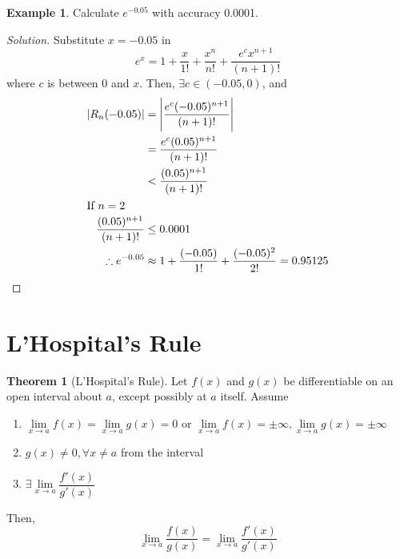 \documentclass[fleqn]{article}
\theoremstyle{definition}
\newtheorem{example}{Example}
\theoremstyle{theorem}
\newtheorem{theorem}{Theorem}
\theoremstyle{remark}
\newenvironment{solution}
{\begin{proof}[Solution]\let\qed\relax}
	{\end{proof}}
\begin{document}
\begin{example}
	Calculate $e^{-0.05}$ with accuracy 0.0001.
\end{example}

\begin{solution}
	Substitute $x = -0.05$ in 
	\begin{equation*}
		e^x = 1 + \dfrac{x}{1!} + \dfrac{x^n}{n!} + \dfrac{e^c x^{n+1}}{(n+1)!}
	\end{equation*}
	where $c$ is between 0 and $x$.
	Then, $\exists c \in (-0.05, 0)$, and 
	\begin{align*}
		|R_n (-0.05)| &= \left|\dfrac{e^c(-0.05)^{n+1}}{(n+1)!}\right| \\
		&= \dfrac{e^c(0.05)^{n+1}}{(n+1)!} \\
		&< \dfrac{(0.05)^{n+1}}{(n+1)!} \\
		\intertext{If $n = 2$}
		\dfrac{(0.05)^{n+1}}{(n+1)!} &\leq 0.0001 \\
		\therefore e^{-0.05} &\approx  1+ \dfrac{(-0.05)}{1!} + \dfrac{(-0.05)^2}{2!} = 0.95125
	\end{align*}
\end{solution}

\section{L'Hospital's Rule}

\begin{theorem}[L'Hospital's Rule] \label{L'Hospital's Rule}
	Let $f(x)$ and $g(x)$ be differentiable on an open interval about $a$, except possibly at $a$ itself. Assume
	\begin{enumerate}[label = \roman*.]
		\item $\lim\limits_{x \to a} f(x) = \lim\limits_{x \to a} g(x) = 0$ or $\lim\limits_{x \to a} f(x) = \pm \infty , \lim\limits_{x \to a} g(x) = \pm \infty$
		\item $g(x) \neq 0, \forall x \neq a$ from the interval
		\item $\exists \lim\limits_{x \to a} \dfrac{f'(x)}{g'(x)}$
	\end{enumerate}
	Then, 
	\begin{equation*}
	\lim\limits_{x \to a} \dfrac{f(x)}{g(x)} = \lim\limits_{x \to a} \dfrac{f'(x)}{g'(x)}
	\end{equation*}
\end{theorem}
\end{document}
